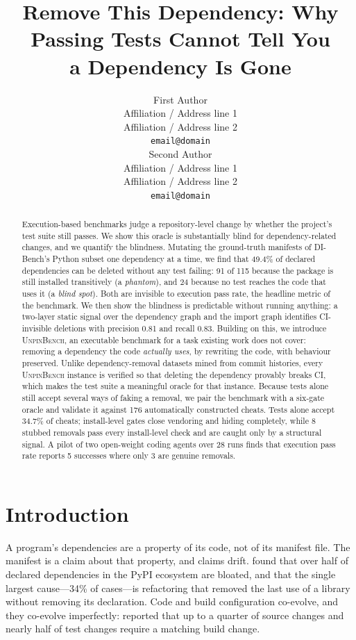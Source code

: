 \documentclass[11pt]{article}
\title{Remove This Dependency: Why Passing Tests Cannot Tell You\\
a Dependency Is Gone}
\author{First Author \\
  Affiliation / Address line 1 \\
  Affiliation / Address line 2 \\
  \texttt{email@domain} \\\And
  Second Author \\
  Affiliation / Address line 1 \\
  Affiliation / Address line 2 \\
  \texttt{email@domain} \\}
\newcommand{\bench}{\textsc{UnpinBench}}
\newcommand{\dibench}{DI-Bench}
\begin{document}
\maketitle

\begin{abstract}
Execution-based benchmarks judge a repository-level change by whether the project's test suite still passes.
We show this oracle is substantially blind for dependency-related changes, and we quantify the blindness.
Mutating the ground-truth manifests of \dibench's Python subset one dependency at a time, we find that 49.4\% of declared dependencies can be deleted without any test failing: 91 of 115 because the package is still installed transitively (a \emph{phantom}), and 24 because no test reaches the code that uses it (a \emph{blind spot}).
Both are invisible to execution pass rate, the headline metric of the benchmark.
We then show the blindness is predictable without running anything: a two-layer static signal over the dependency graph and the import graph identifies CI-invisible deletions with precision 0.81 and recall 0.83.
Building on this, we introduce \bench, an executable benchmark for a task existing work does not cover: removing a dependency the code \emph{actually uses}, by rewriting the code, with behaviour preserved.
Unlike dependency-removal datasets mined from commit histories, every \bench{} instance is verified so that deleting the dependency provably breaks CI, which makes the test suite a meaningful oracle for that instance.
Because tests alone still accept several ways of faking a removal, we pair the benchmark with a six-gate oracle and validate it against 176 automatically constructed cheats.
Tests alone accept 34.7\% of cheats; install-level gates close vendoring and hiding completely, while 8 stubbed removals pass every install-level check and are caught only by a structural signal.
A pilot of two open-weight coding agents over 28 runs finds that execution pass rate reports 5 successes where only 3 are genuine removals.
\end{abstract}

\section{Introduction}

A program's dependencies are a property of its code, not of its manifest file.
The manifest is a claim about that property, and claims drift.
\citet{drosos2024bloat} found that over half of declared dependencies in the PyPI ecosystem are bloated, and that the single largest cause---34\% of cases---is refactoring that removed the last use of a library without removing its declaration.
Code and build configuration co-evolve, and they co-evolve imperfectly: \citet{mcintosh2011build} reported that up to a quarter of source changes and nearly half of test changes require a matching build change.
\end{document}
